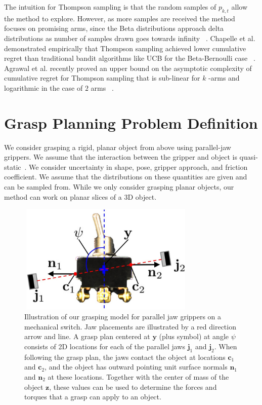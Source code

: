 \documentclass[10pt, conference]{ieeeconf}      %
\newcommand{\bc}{\mathbf{c}}
\newcommand{\bj}{\mathbf{j}}
\newcommand{\bn}{\mathbf{n}}
\newcommand{\by}{\mathbf{y}}
\newcommand{\bz}{\mathbf{z}}
\begin{document}
The intuition for Thompson sampling is that the random samples of $p_{k,t}$ allow the method to explore. However, as more samples are received the method focuses on promising arms, since the Beta distributions approach delta distributions as number of samples drawn goes towards infinity ~\cite{goetschalckx2011continuous}. Chapelle et al. demonstrated empirically that Thompson sampling achieved lower cumulative regret than traditional bandit algorithms like UCB for the Beta-Bernoulli case ~\cite{chapelle2011empirical}. Agrawal et al. recently proved an upper bound on the asymptotic complexity of  cumulative regret for  Thompson sampling that is sub-linear  for $k$ -arms and logarithmic in the case of $2$ arms ~\cite{agrawal2011analysis}. 




\section{Grasp Planning Problem Definition}
We consider grasping a rigid, planar object from above using parallel-jaw grippers.
We assume that the interaction between the gripper and object is quasi-static~\cite{kehoe2012estimating, kehoe2012toward}.
We consider uncertainty in shape, pose, gripper approach, and friction coefficient. We assume that the distributions on these quantities are given and can be sampled from.  While we only consider grasping planar objects, our method can work on planar slices of a 3D object. 
\begin{figure}[t!]
\centering
\includegraphics[width = 8.5cm, height = 5.25cm]{figures/bandit_grasp_model.jpg}
\caption{Illustration of our grasping model for parallel jaw grippers on a mechanical switch. Jaw placements are illustrated by a red direction arrow and line. A grasp plan centered at $\by$ (plus symbol) at angle $\psi$ consists of 2D locations for each of the parallel jaws $\bj_1$ and $\bj_2$. When following the grasp plan, the jaws contact the object at locations $\bc_1$ and $\bc_2$, and the object has outward pointing unit surface normals $\bn_1$ and $\bn_2$ at these locations. Together with the center of mass of the object $\bz$, these values can be used to determine the forces and torques that a grasp can apply to an object.}
\vspace*{-2ex}
\label{fig:grasp_model}
\end{figure}
\end{document}
